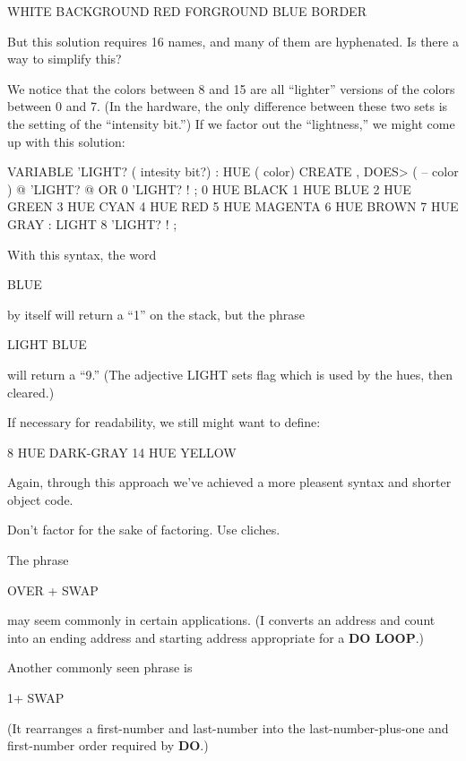 \begin{Code}
WHITE BACKGROUND  RED FORGROUND  BLUE BORDER
\end{Code}
But this solution requires 16 names, and many of them are hyphenated. Is there a way to simplify this?

We notice that the colors between 8 and 15 are all ``lighter'' versions of the colors between 0 and 7. (In the hardware, the only difference between these two sets is the setting of the ``intensity bit.'') If we factor out the ``lightness,'' we might come up with this solution:

\begin{Code}
VARIABLE 'LIGHT?  ( intesity bit?)
: HUE  ( color)  CREATE ,
   DOES>  ( -- color )  @  'LIGHT? @  OR  0 'LIGHT? ! ;
 0 HUE BLACK         1 HUE BLUE           2 HUE GREEN
 3 HUE CYAN          4 HUE RED            5 HUE MAGENTA
 6 HUE BROWN         7 HUE GRAY
: LIGHT   8 'LIGHT? ! ;
\end{Code}

\noindent     
With this syntax, the word

\begin{Code}
BLUE
\end{Code}
by itself will return a ``1'' on the stack, but the phrase

\begin{Code}
LIGHT BLUE
\end{Code}
will return a ``9.'' (The adjective LIGHT sets flag which is used by the hues, then cleared.)

\goodbreak
If necessary for readability, we still might want to define:

\begin{Code}
8 HUE DARK-GRAY
14 HUE YELLOW
\end{Code}
Again, through this approach we've achieved a more pleasent syntax and shorter object code.

\begin{tip}
Don't factor for the sake of factoring. Use cliches.
\end{tip}
The phrase

\begin{Code}
OVER + SWAP
\end{Code}
may seem commonly in certain applications. (I converts an address and count into an ending address and starting address appropriate for a \textbf{DO LOOP}.)

Another commonly seen phrase is

\begin{Code}
1+ SWAP
\end{Code}
(It rearranges a first-number and last-number into the last-number-plus-one and first-number order required by \textbf{DO}.)

